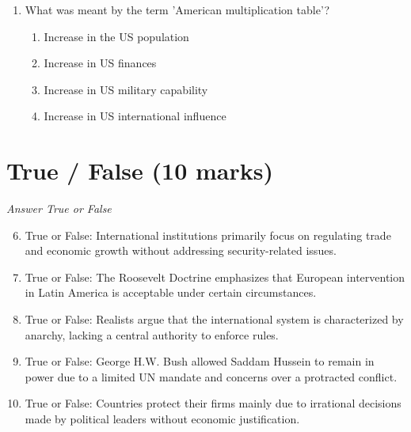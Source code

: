 \documentclass[12pt]{article}
\begin{document}
\begin{enumerate}[label=\arabic*.]
\begin{enumerate}[label=(\alph*)]
    \item Societal groups have a right to survive.
    \item Societal groups have their own reality.
    \item Societal groups are constituted by social interaction.
    \item Societal groups are multiple-identity units.
\end{enumerate}
\item What was meant by the term 'American multiplication table'?
\begin{enumerate}[label=(\alph*)]
    \item Increase in the US population
    \item Increase in US finances
    \item Increase in US military capability
    \item Increase in US international influence
\end{enumerate}
\end{enumerate}

\section*{True / False (10 marks)}
\textit{Answer True or False}
\begin{enumerate}[label=\arabic*.]
\setcounter{enumi}{5}
\item True or False: International institutions primarily focus on regulating trade and economic growth without addressing security-related issues.
\item True or False: The Roosevelt Doctrine emphasizes that European intervention in Latin America is acceptable under certain circumstances.
\item True or False: Realists argue that the international system is characterized by anarchy, lacking a central authority to enforce rules.
\item True or False: George H.W. Bush allowed Saddam Hussein to remain in power due to a limited UN mandate and concerns over a protracted conflict.
\item True or False: Countries protect their firms mainly due to irrational decisions made by political leaders without economic justification.
\end{enumerate}
\end{document}
